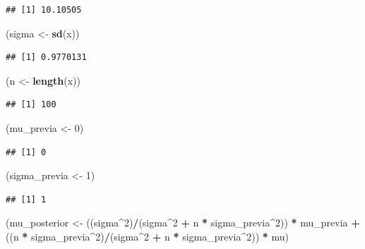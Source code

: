 \documentclass[
  12pt,
]{book}
\newenvironment{Shaded}{\begin{snugshade}}{\end{snugshade}}
\newcommand{\DecValTok}[1]{\textcolor[rgb]{0.00,0.00,0.81}{#1}}
\newcommand{\KeywordTok}[1]{\textcolor[rgb]{0.13,0.29,0.53}{\textbf{#1}}}
\newcommand{\NormalTok}[1]{#1}
\newcommand{\OperatorTok}[1]{\textcolor[rgb]{0.81,0.36,0.00}{\textbf{#1}}}
\newcommand{\StringTok}[1]{\textcolor[rgb]{0.31,0.60,0.02}{#1}}
\begin{document}
\begin{verbatim}
## [1] 10.10505
\end{verbatim}

\begin{Shaded}
\begin{Highlighting}[]
\NormalTok{(sigma \textless{}{-}}\StringTok{ }\KeywordTok{sd}\NormalTok{(x))}
\end{Highlighting}
\end{Shaded}

\begin{verbatim}
## [1] 0.9770131
\end{verbatim}

\begin{Shaded}
\begin{Highlighting}[]
\NormalTok{(n \textless{}{-}}\StringTok{ }\KeywordTok{length}\NormalTok{(x))}
\end{Highlighting}
\end{Shaded}

\begin{verbatim}
## [1] 100
\end{verbatim}

\begin{Shaded}
\begin{Highlighting}[]
\NormalTok{(mu\_previa \textless{}{-}}\StringTok{ }\DecValTok{0}\NormalTok{)}
\end{Highlighting}
\end{Shaded}

\begin{verbatim}
## [1] 0
\end{verbatim}

\begin{Shaded}
\begin{Highlighting}[]
\NormalTok{(sigma\_previa \textless{}{-}}\StringTok{ }\DecValTok{1}\NormalTok{)}
\end{Highlighting}
\end{Shaded}

\begin{verbatim}
## [1] 1
\end{verbatim}

\begin{Shaded}
\begin{Highlighting}[]
\NormalTok{(mu\_posterior \textless{}{-}}\StringTok{ }\NormalTok{((sigma}\OperatorTok{\^{}}\DecValTok{2}\NormalTok{)}\OperatorTok{/}\NormalTok{(sigma}\OperatorTok{\^{}}\DecValTok{2} \OperatorTok{+}\StringTok{ }\NormalTok{n }\OperatorTok{*}\StringTok{ }\NormalTok{sigma\_previa}\OperatorTok{\^{}}\DecValTok{2}\NormalTok{)) }\OperatorTok{*}\StringTok{ }
\StringTok{    }\NormalTok{mu\_previa }\OperatorTok{+}\StringTok{ }\NormalTok{((n }\OperatorTok{*}\StringTok{ }\NormalTok{sigma\_previa}\OperatorTok{\^{}}\DecValTok{2}\NormalTok{)}\OperatorTok{/}\NormalTok{(sigma}\OperatorTok{\^{}}\DecValTok{2} \OperatorTok{+}\StringTok{ }\NormalTok{n }\OperatorTok{*}\StringTok{ }
\StringTok{    }\NormalTok{sigma\_previa}\OperatorTok{\^{}}\DecValTok{2}\NormalTok{)) }\OperatorTok{*}\StringTok{ }\NormalTok{mu)}
\end{Highlighting}
\end{Shaded}
\end{document}
